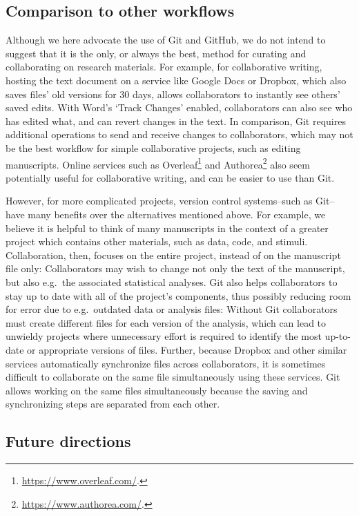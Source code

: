 \documentclass[
  american,
  ,doc,floatsintext]{apa6}
\begin{document}
\hypertarget{comparison-to-other-workflows}{%
\subsection{Comparison to other workflows}\label{comparison-to-other-workflows}}

Although we here advocate the use of Git and GitHub, we do not intend to suggest that it is the only, or always the best, method for curating and collaborating on research materials. For example, for collaborative writing, hosting the text document on a service like Google Docs or Dropbox, which also saves files' old versions for 30 days, allows collaborators to instantly see others' saved edits. With Word's `Track Changes' enabled, collaborators can also see who has edited what, and can revert changes in the text. In comparison, Git requires additional operations to send and receive changes to collaborators, which may not be the best workflow for simple collaborative projects, such as editing manuscripts. Online services such as Overleaf\footnote{\url{https://www.overleaf.com/}.} and Authorea\footnote{\url{https://www.authorea.com/}.} also seem potentially useful for collaborative writing, and can be easier to use than Git.

However, for more complicated projects, version control systems--such as Git--have many benefits over the alternatives mentioned above. For example, we believe it is helpful to think of many manuscripts in the context of a greater project which contains other materials, such as data, code, and stimuli. Collaboration, then, focuses on the entire project, instead of on the manuscript file only: Collaborators may wish to change not only the text of the manuscript, but also e.g.~the associated statistical analyses. Git also helps collaborators to stay up to date with all of the project's components, thus possibly reducing room for error due to e.g.~outdated data or analysis files: Without Git collaborators must create different files for each version of the analysis, which can lead to unwieldy projects where unnecessary effort is required to identify the most up-to-date or appropriate versions of files. Further, because Dropbox and other similar services automatically synchronize files across collaborators, it is sometimes difficult to collaborate on the same file simultaneously using these services. Git allows working on the same files simultaneously because the saving and synchronizing steps are separated from each other.

\hypertarget{future-directions}{%
\subsection{Future directions}\label{future-directions}}
\end{document}
